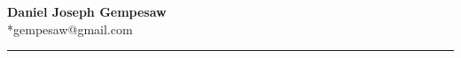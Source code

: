 \newcommand{\myauthor}[2] {
  \begin{center}
    \Large
    \textbf{#1}
    \normalsize
    \\*#2
    \vspace{0.125cm}
    \hrule
    \vspace{-0.625cm}
  \end{center}
}
%
\myauthor{Daniel Joseph Gempesaw}
         {gempesaw@gmail.com}
